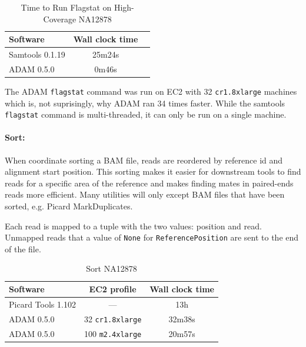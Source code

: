 \documentclass[10pt,twocolumn]{article}
\theoremstyle{plain}
\begin{document}
\begin{table}[h]
\caption{Time to Run Flagstat on High-Coverage NA12878}
\label{tab:time-flagstat}
\begin{center}
\begin{tabular}{| l | c | c |}
\hline
\bf Software  & \bf Wall clock time \\
\hline
Samtools 0.1.19 & 25m24s \\ 
ADAM 0.5.0 & 0m46s \\
\hline
\end{tabular}
\end{center}
\end{table}

The ADAM \texttt{flagstat} command was run on EC2 with 32 \texttt{cr1.8xlarge} machines
which is, not suprisingly, why ADAM ran 34 times faster. While the samtools \texttt{flagstat}
command is multi-threaded, it can only be run on a single machine.

\paragraph{Sort:}
\label{sec:sort}

When coordinate sorting a BAM file, reads are reordered by reference id and alignment start position.
This sorting makes it easier for downstream tools to find reads for a specific area of the reference
and makes finding mates in paired-ends reads more efficient. Many utilities will only except 
BAM files that have been sorted, e.g. Picard MarkDuplicates.

Each read is mapped to a tuple with the two values: position and read.
Unmapped reads that a value of \texttt{None} for \texttt{ReferencePosition}
are sent to the end of the file.

\begin{table}[h]
\caption{Sort NA12878}
\label{tab:time-flagstat}
\begin{scriptsize}
\begin{center}
\begin{tabular}{| l | c | c |}
\hline
\bf Software & \bf EC2 profile & \bf Wall clock time \\
\hline
Picard Tools 1.102 & --- & 13h \\
ADAM 0.5.0 & 32 \texttt{cr1.8xlarge} & 32m38s \\
ADAM 0.5.0 & 100 \texttt{m2.4xlarge} & 20m57s \\ 
\hline
\end{tabular}
\end{center}
\end{scriptsize}
\end{table}
\end{document}
